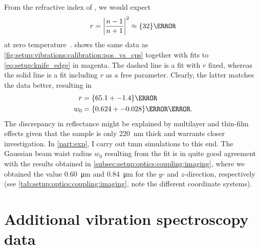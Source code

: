 From the refractive index of , we would expect
\begin{equation}
    r = \abs{\frac{n-1}{n+1}}^2 \approx \qty{32}{\percent}
\end{equation}
at zero temperature~\cite{Talghader1995}.
 shows the same data as \cref{fig:setup:vibrations:calibration:pos_vs_cps} together with fits to \cref{eq:setup:knife_edge} in magenta.
The dashed line is a fit with $r$ fixed, whereas the solid line is a fit including $r$ as a free parameter.
Clearly, the latter matches the data better, resulting in
\begin{align}
    r &= \qty{65.1+-1.4}{\percent} \\
    w_0 &= \qty{0.624+-0.028}{\micro\meter}.
\end{align}
The discrepancy in reflectance might be explained by multilayer and thin-film effects given that the sample is only \qty{220}{\nano\meter} thick and warrants closer investigation.
In \cref{part:exp}, I carry out \gls{tmm} simulations to this end.
The Gaussian beam waist radius $w_0$ resulting from the fit is in quite good agreement with the results obtained in \cref{subsec:setup:optics:coupling:imaging}, where we obtained the value \qty{0.60}{\micro\meter} and \qty{0.84}{\micro\meter} for the $y$- and $z$-direction, respectively (see \cref{tab:setup:optics:coupling:imaging}, note the different coordinate systems).

\section{Additional vibration spectroscopy data}\label{sec:app:setup:vibrations:data}
